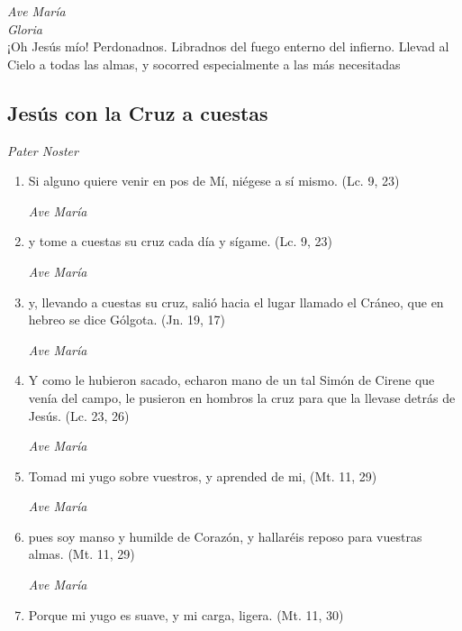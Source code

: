 \documentclass[a4paper,11pt, oneside]{report}
\begin{document}
      \textit{Ave María} \\
      \indent\textit{Gloria} \\
      \indent¡Oh Jesús mío! Perdonadnos. Libradnos del fuego enterno del infierno. Llevad al Cielo a todas las almas, y socorred especialmente a las más 
      necesitadas

    \subsection*{ Jesús con la Cruz a cuestas }
      
      \textit{Pater Noster}

      \begin{enumerate}
        
        \item Si alguno quiere venir en pos de Mí, niégese a sí mismo. (Lc. 9, 23)

        \textit{Ave María}

        \item y tome a cuestas su cruz cada día y sígame. (Lc. 9, 23)

        \textit{Ave María}

        \item y, llevando a cuestas su cruz, salió hacia el lugar llamado el Cráneo, que en hebreo se dice Gólgota. (Jn. 19, 17)

        \textit{Ave María}

        \item Y como le hubieron sacado, echaron mano de un tal Simón de Cirene que venía del campo, le pusieron en hombros la cruz para que la llevase
        detrás de Jesús. (Lc. 23, 26)

        \textit{Ave María}

        \item Tomad mi yugo sobre vuestros, y aprended de mi, (Mt. 11, 29)

        \textit{Ave María}

        \item pues soy manso y humilde de Corazón, y hallaréis reposo para vuestras almas. (Mt. 11, 29)

        \textit{Ave María}

        \item Porque mi yugo es suave, y mi carga, ligera. (Mt. 11, 30)


\end{enumerate}
\end{document}
